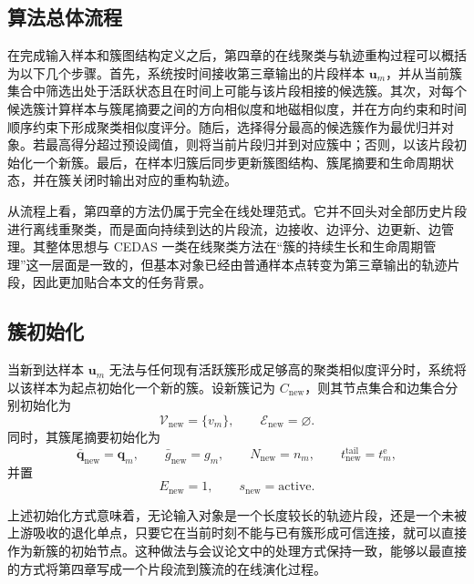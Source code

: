 \documentclass{xdupgthesis}
\begin{document}
\subsection{算法总体流程}

在完成输入样本和簇图结构定义之后，第四章的在线聚类与轨迹重构过程可以概括为以下几个步骤。首先，系统按时间接收第三章输出的片段样本 $\mathbf{u}_m$，并从当前簇集合中筛选出处于活跃状态且在时间上可能与该片段相接的候选簇。其次，对每个候选簇计算样本与簇尾摘要之间的方向相似度和地磁相似度，并在方向约束和时间顺序约束下形成聚类相似度评分。随后，选择得分最高的候选簇作为最优归并对象。若最高得分超过预设阈值，则将当前片段归并到对应簇中；否则，以该片段初始化一个新簇。最后，在样本归簇后同步更新簇图结构、簇尾摘要和生命周期状态，并在簇关闭时输出对应的重构轨迹。

从流程上看，第四章的方法仍属于完全在线处理范式。它并不回头对全部历史片段进行离线重聚类，而是面向持续到达的片段流，边接收、边评分、边更新、边管理。其整体思想与 CEDAS 一类在线聚类方法在“簇的持续生长和生命周期管理”这一层面是一致的，但基本对象已经由普通样本点转变为第三章输出的轨迹片段，因此更加贴合本文的任务背景。

\subsection{簇初始化}

当新到达样本 $\mathbf{u}_m$ 无法与任何现有活跃簇形成足够高的聚类相似度评分时，系统将以该样本为起点初始化一个新的簇。设新簇记为 $C_{\mathrm{new}}$，则其节点集合和边集合分别初始化为
\begin{equation}
	\mathcal{V}_{\mathrm{new}}=\{v_m\},\qquad
	\mathcal{E}_{\mathrm{new}}=\varnothing.
\end{equation}
同时，其簇尾摘要初始化为
\begin{equation}
	\bar{\mathbf{q}}_{\mathrm{new}}=\mathbf{q}_m,\qquad
	\bar{g}_{\mathrm{new}}=g_m,\qquad
	N_{\mathrm{new}}=n_m,\qquad
	t_{\mathrm{new}}^{\mathrm{tail}}=t_m^{\mathrm{e}},
\end{equation}
并置
\begin{equation}
	E_{\mathrm{new}}=1,\qquad
	s_{\mathrm{new}}=\mathrm{active}.
\end{equation}

上述初始化方式意味着，无论输入对象是一个长度较长的轨迹片段，还是一个未被上游吸收的退化单点，只要它在当前时刻不能与已有簇形成可信连接，就可以直接作为新簇的初始节点。这种做法与会议论文中的处理方式保持一致，能够以最直接的方式将第四章写成一个片段流到簇流的在线演化过程。
\end{document}
